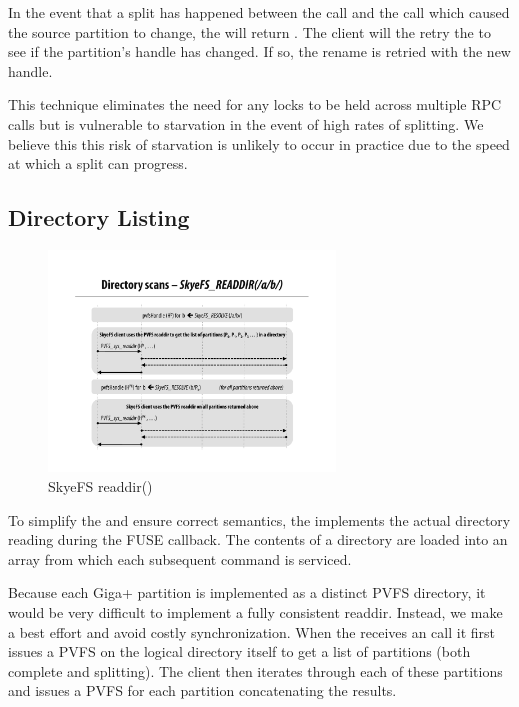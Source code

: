 \documentclass[onecolumn, 11pt, letterpaper]{article}
\begin{document}
In the event that a split has happened between the  call and
the  call which caused the source partition to change, the
 will return .  The client will the retry the
 to see if the partition's handle has changed.  If so, the
rename is retried with the new handle.

This technique eliminates the need for any locks to be held across multiple RPC
calls but is vulnerable to starvation in the event of high rates of splitting.
We believe this this risk of starvation is unlikely to occur in practice due to
the speed at which a split can progress.

\subsection{Directory Listing}
\begin{figure}
\begin{center}
\includegraphics[width=3in]{figure-readdir}
\end{center}
\caption{SkyeFS readdir()}
\end{figure}
To simplify the  and ensure correct semantics, the
 implements the actual directory reading during the FUSE
 callback.  The contents of a directory are loaded into an array
from which each subsequent  command is serviced.

Because each Giga+ partition is implemented as a distinct PVFS directory, it
would be very difficult to implement a fully consistent readdir.  Instead, we
make a best effort and avoid costly synchronization.  When the
 receives an  call it first issues a PVFS
 on the logical directory itself to get a list of partitions
(both complete and splitting).  The client then iterates through each of these
partitions and issues a PVFS  for each partition concatenating
the results.  
\end{document}
